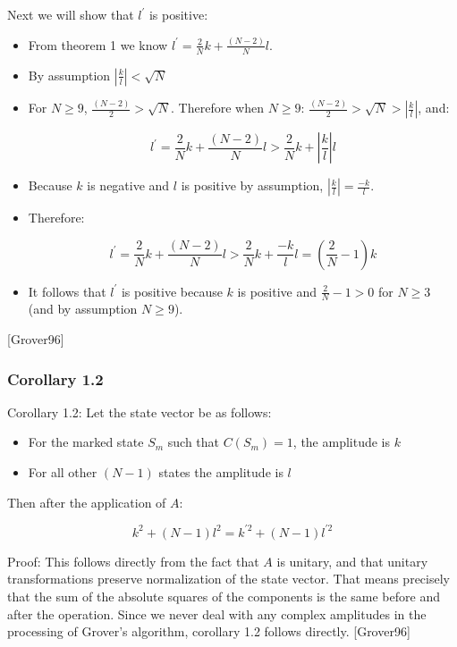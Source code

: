 \documentclass[]{article}
\begin{document}
Next we will show that $l^{'}$ is positive:
\begin{itemize}
\item From theorem 1 we know $l^{'} = \frac{2}{N}k+\frac{(N-2)}{N}l$.

\item By assumption $\left|\frac{k}{l}\right| < \sqrt{N}$

\item For $N \ge 9$, $ \frac{(N-2)}{2} > \sqrt{N}$. Therefore when $N \ge 9$: $ \frac{(N-2)}{2} > \sqrt{N} > \left|\frac{k}{l}\right|$, and:

\[ l^{'} = \frac{2}{N}k+\frac{(N-2)}{N}l > \frac{2}{N}k + \left|\frac{k}{l}\right|l \]

\item Because $k$ is negative and $l$ is positive by assumption, $\left|\frac{k}{l}\right| = \frac{-k}{l}$.

\item Therefore: 

\[ l^{'} = \frac{2}{N}k+\frac{(N-2)}{N}l > \frac{2}{N}k + \frac{-k}{l}l = (\frac{2}{N}-1)k \]

\item It follows that $l^{'}$ is positive because $k$ is positive and
  $\frac{2}{N}-1 > 0$ for $N \ge 3$ (and by assumption $N \ge 9$).
\end{itemize}
[Grover96]

\subsubsection{Corollary 1.2}

Corollary 1.2: Let the state vector be as follows:
\begin{itemize}
\item For the marked state $S_{m}$ such that $C(S_{m}) = 1$, the amplitude is $k$
\item For all other $(N-1)$ states the amplitude is $l$
\end{itemize}
Then after the application of $A$:

\[ k^{2} + (N-1)l^{2} = k^{'2} + (N-1)l^{'2} \]

Proof: This follows directly from the fact that $A$ is unitary, and
that unitary transformations preserve normalization of the state
vector.  That means precisely that the sum of the absolute squares of
the components is the same before and after the operation.  Since we
never deal with any complex amplitudes in the processing of Grover's
algorithm, corollary 1.2 follows directly. [Grover96]
\end{document}
